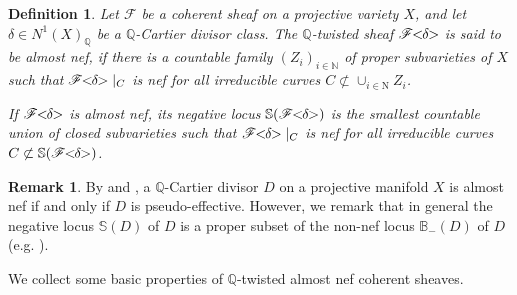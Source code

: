 \documentclass[english,reqno]{amsart}
\newcommand\bbB{{\mathbb B}}
\newcommand\bbQ{{\mathbb Q}}
\newcommand\bbS{{\mathbb S}}
\newcommand\sF{{\mathscr F}}
\theoremstyle{plain}
\newtheorem{defn}[thm]{Definition}
\theoremstyle{definition}
\newtheorem{remark}[thm]{Remark}
\numberwithin{equation}{section} %
\begin{document}
\begin{defn}
    Let $\sF$ be a coherent sheaf on a  projective variety $X$, and let $\delta\in N^1(X)_{\bbQ}$ be a $\bbQ$-Cartier divisor class.
    The $\bbQ$-twisted sheaf $\sF\hspace{-0.8ex}<\hspace{-0.8ex}\delta\hspace{-0.8ex}>$ is said to be almost nef, if there is a countable family $(Z_i)_{i\in \mathbb{N}}$ of proper subvarieties of $X$ such that $\sF\hspace{-0.8ex}<\hspace{-0.8ex}\delta\hspace{-0.8ex}>\vert_C$ is nef for all irreducible curves $C\not\subset \cup_{i\in \mathrm{N}} Z_i$.

     If $\sF\hspace{-0.8ex}<\hspace{-0.8ex}\delta\hspace{-0.8ex}>$ is almost nef,  its negative locus  $\bbS(\sF\hspace{-0.8ex}<\hspace{-0.8ex}\delta\hspace{-0.8ex}>)$  is the smallest countable union of  closed subvarieties such that $\sF\hspace{-0.8ex}<\hspace{-0.8ex}\delta\hspace{-0.8ex}>\vert_C$ is nef for all irreducible curves $C\not\subset \bbS(\sF\hspace{-0.8ex}<\hspace{-0.8ex}\delta\hspace{-0.8ex}>)$.
\end{defn}

\begin{remark}
        By \cite[Proposition 3.3]{DemaillyPeternellSchneider2001} and \cite[Theorem 0.2]{BoucksomDemaillyPuaunPeternell2013}, a $\bbQ$-Cartier divisor $D$ on a projective manifold $X$ is almost nef if and only if $D$ is pseudo-effective.
        However, we remark that in general the negative locus $\bbS(D)$ of $D$ is   a proper subset of the non-nef locus $\bbB_{-}(D)$ of $D$ (e.g. \cite[Remark 6.3]{BoucksomDemaillyPuaunPeternell2013}).
\end{remark}

We collect some basic properties of $\bbQ$-twisted almost nef coherent sheaves.
\end{document}
